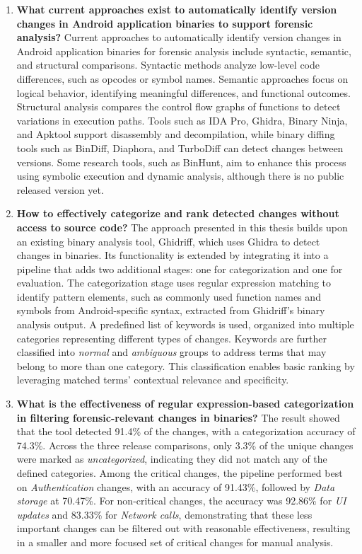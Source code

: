 \begin{enumerate}
\item{\textbf{What current approaches exist to automatically identify version changes in Android application binaries to support forensic analysis?}}
\newline
Current approaches to automatically identify version changes in Android application binaries for forensic analysis include syntactic, semantic, and structural comparisons. Syntactic methods analyze low-level code differences, such as opcodes or symbol names. Semantic approaches focus on logical behavior, identifying meaningful differences, and functional outcomes. Structural analysis compares the control flow graphs of functions to detect variations in execution paths. Tools such as IDA Pro, Ghidra, Binary Ninja, and Apktool support disassembly and decompilation, while binary diffing tools such as BinDiff, Diaphora, and TurboDiff can detect changes between versions. Some research tools, such as BinHunt, aim to enhance this process using symbolic execution and dynamic analysis, although there is no public released version yet.

\item{\textbf{How to effectively categorize and rank detected changes without access to source code?}}
\newline
The approach presented in this thesis builds upon an existing binary analysis tool, Ghidriff, which uses Ghidra to detect changes in binaries. Its functionality is extended by integrating it into a pipeline that adds two additional stages: one for categorization and one for evaluation. The categorization stage uses regular expression matching to identify pattern elements, such as commonly used function names and symbols from Android-specific syntax,  extracted from Ghidriff’s binary analysis output. A predefined list of keywords is used, organized into multiple categories representing different types of changes. Keywords are further classified into \textit{normal} and \textit{ambiguous} groups to address terms that may belong to more than one category. This classification enables basic ranking by leveraging matched terms' contextual relevance and specificity. 

\newpage
\item\textbf{{What is the effectiveness of regular expression-based categorization in filtering forensic-relevant changes in binaries?}}
\newline
The result showed that the tool detected 91.4\% of the changes, with a categorization accuracy of 74.3\%. Across the three release comparisons, only 3.3\% of the unique changes were marked as \textit{uncategorized}, indicating they did not match any of the defined categories. Among the critical changes, the pipeline performed best on \textit{Authentication} changes, with an accuracy of 91.43\%, followed by \textit{Data storage} at 70.47\%. For non-critical changes, the accuracy was 92.86\% for \textit{UI updates} and 83.33\% for \textit{Network calls}, demonstrating that these less important changes can be filtered out with reasonable effectiveness, resulting in a smaller and more focused set of critical changes for manual analysis.
\end{enumerate}


